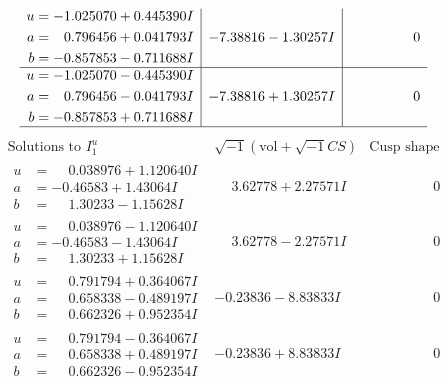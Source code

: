 \documentclass[1p]{elsarticle_modified}
\theoremstyle{definition}
\newcommand{\I}{\sqrt{-1}}
\begin{document}
$$\begin{array}{c|c|c}
\begin{aligned}
u &= -1.025070 + 0.445390 I \\
a &= \phantom{-}0.796456 + 0.041793 I \\
b &= -0.857853 - 0.711688 I\end{aligned}
 & -7.38816 - 1.30257 I & \phantom{-0.000000 } 0 \\ \hline\begin{aligned}
u &= -1.025070 - 0.445390 I \\
a &= \phantom{-}0.796456 - 0.041793 I \\
b &= -0.857853 + 0.711688 I\end{aligned}
 & -7.38816 + 1.30257 I & \phantom{-0.000000 } 0\\
 \hline 
 \end{array}$$\newpage$$\begin{array}{c|c|c}  
\text{Solutions to }I^u_{1}& \I (\text{vol} + \sqrt{-1}CS) & \text{Cusp shape}\\
 \hline 
\begin{aligned}
u &= \phantom{-}0.038976 + 1.120640 I \\
a &= -0.46583 + 1.43064 I \\
b &= \phantom{-}1.30233 - 1.15628 I\end{aligned}
 & \phantom{-}3.62778 + 2.27571 I & \phantom{-0.000000 } 0 \\ \hline\begin{aligned}
u &= \phantom{-}0.038976 - 1.120640 I \\
a &= -0.46583 - 1.43064 I \\
b &= \phantom{-}1.30233 + 1.15628 I\end{aligned}
 & \phantom{-}3.62778 - 2.27571 I & \phantom{-0.000000 } 0 \\ \hline\begin{aligned}
u &= \phantom{-}0.791794 + 0.364067 I \\
a &= \phantom{-}0.658338 - 0.489197 I \\
b &= \phantom{-}0.662326 + 0.952354 I\end{aligned}
 & -0.23836 - 8.83833 I & \phantom{-0.000000 } 0 \\ \hline\begin{aligned}
u &= \phantom{-}0.791794 - 0.364067 I \\
a &= \phantom{-}0.658338 + 0.489197 I \\
b &= \phantom{-}0.662326 - 0.952354 I\end{aligned}
 & -0.23836 + 8.83833 I & \phantom{-0.000000 } 0 \\ \hline\begin{aligned}

\end{aligned}
\end{array}$$
\end{document}

